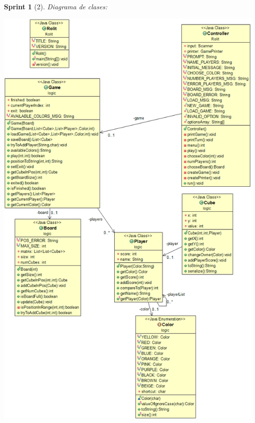 \documentclass[12pt,a4paper,openright]{book}
\theoremstyle{break}
\newtheorem*{sprint}{Sprint}
\begin{document}
\begin{sprint}[2]
Diagrama de clases:
\begin{center}
\includegraphics[scale=0.4]{diagramaclasesS2.png}
\end{center}


\end{sprint}
\end{document}
